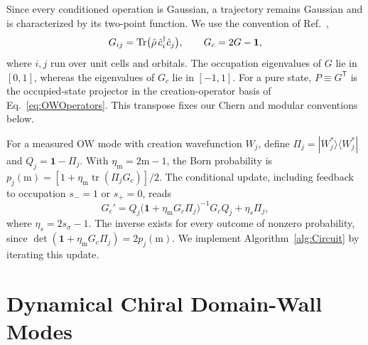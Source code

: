 \documentclass[aps,prb,10pt,twocolumn,superscriptaddress,longbibliography,floatfix]{revtex4-2}
\newcommand{\Id}{\mathbf{1}}
\begin{document}
{\color{blue}
Since every conditioned operation is Gaussian, a trajectory remains Gaussian and is characterized by its two-point function. We use the convention of Ref.~\cite{BhuiyanPanJian2026},
\begin{equation}
    G_{ij}=\Tr\!\big(\hat\rho\,\hat c_i^\dagger\hat c_j\big),
    \qquad G_c=2G-\Id,
    \label{eq:TwoPoint}
\end{equation}
where $i,j$ run over unit cells and orbitals. The occupation eigenvalues of $G$ lie in $[0,1]$, whereas the eigenvalues of $G_c$ lie in $[-1,1]$. For a pure state, $P\equiv G^{\mathsf T}$ is the occupied-state projector in the creation-operator basis of Eq.~\eqref{eq:OWOperators}. This transpose fixes our Chern and modular conventions below.

For a measured OW mode with creation wavefunction $W_j$, define $\Pi_j=|W_j^*\rangle\langle W_j^*|$ and $Q_j=\Id-\Pi_j$. With $\eta_{\mathrm m}=2\mathrm m-1$, the Born probability is $p_j(\mathrm m)=[1+\eta_{\mathrm m}\operatorname{tr}(\Pi_jG_c)]/2$. The conditional update, including feedback to occupation $s_-=1$ or $s_+=0$, reads~\cite{bravyi2004lagrangian,BhuiyanPanJian2026}
\begin{equation}
    G_c'=Q_j\big(\Id+\eta_{\mathrm m}G_c\Pi_j\big)^{-1}G_cQ_j+\eta_s\Pi_j,
    \label{eq:CovarianceUpdate}
\end{equation}
where $\eta_s=2s_\sigma-1$. The inverse exists for every outcome of nonzero probability, since $\det(\Id+\eta_{\mathrm m}G_c\Pi_j)=2p_j(\mathrm m)$. We implement Algorithm~\ref{alg:Circuit} by iterating this update.
}

\section{Dynamical Chiral Domain-Wall Modes}
\label{sec:Results}
\end{document}
